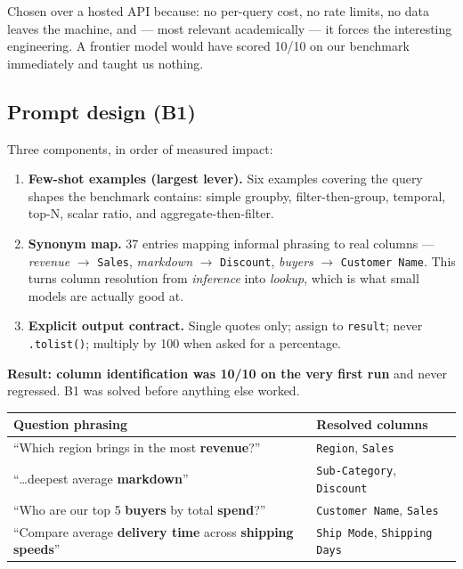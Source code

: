 \documentclass[11pt,a4paper]{article}
\begin{document}
Chosen over a hosted API because: no per-query cost, no rate limits, no data leaves the
machine, and --- most relevant academically --- it forces the interesting engineering.
A frontier model would have scored 10/10 on our benchmark immediately and taught us
nothing.

\subsection{Prompt design (B1)}

Three components, in order of measured impact:

\begin{enumerate}[leftmargin=*]
\item \textbf{Few-shot examples (largest lever).} Six examples covering the query
      shapes the benchmark contains: simple groupby, filter-then-group, temporal,
      top-N, scalar ratio, and aggregate-then-filter.
\item \textbf{Synonym map.} 37 entries mapping informal phrasing to real columns ---
      \emph{revenue} $\rightarrow$ \texttt{Sales}, \emph{markdown} $\rightarrow$
      \texttt{Discount}, \emph{buyers} $\rightarrow$ \texttt{Customer Name}. This turns
      column resolution from \emph{inference} into \emph{lookup}, which is what small
      models are actually good at.
\item \textbf{Explicit output contract.} Single quotes only; assign to
      \texttt{result}; never \texttt{.tolist()}; multiply by 100 when asked for a
      percentage.
\end{enumerate}

\textbf{Result: column identification was 10/10 on the very first run} and never
regressed. B1 was solved before anything else worked.

\begin{center}
\begin{tabularx}{\textwidth}{@{}Xl@{}}
\toprule
\textbf{Question phrasing} & \textbf{Resolved columns} \\
\midrule
``Which region brings in the most \textbf{revenue}?''                  & \texttt{Region}, \texttt{Sales} \\
``\ldots deepest average \textbf{markdown}''                           & \texttt{Sub-Category}, \texttt{Discount} \\
``Who are our top 5 \textbf{buyers} by total \textbf{spend}?''         & \texttt{Customer Name}, \texttt{Sales} \\
``Compare average \textbf{delivery time} across \textbf{shipping speeds}'' & \texttt{Ship Mode}, \texttt{Shipping Days} \\
\bottomrule
\end{tabularx}
\end{center}
\end{document}
